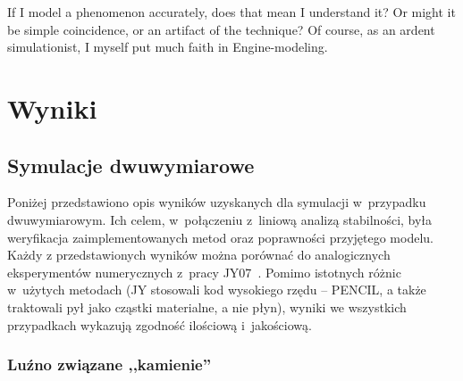 \begin{savequote}[75mm]
   If I model a phenomenon accurately, does that mean I understand it? Or might it be simple coincidence, or an artifact
   of the technique? Of course, as an ardent simulationist, I myself put much faith in Engine-modeling.
\end{savequote}

\chapter{Wyniki}



\section{Symulacje dwuwymiarowe}
\label{sec:sim_2d}
Poniżej przedstawiono opis wyników uzyskanych dla symulacji w~przypadku
dwuwymiarowym. Ich celem, w~połączeniu z~liniową analizą stabilności, była
weryfikacja zaimplementowanych metod oraz poprawności przyjętego modelu. Każdy z
przedstawionych wyników można porównać do analogicznych eksperymentów
numerycznych z~pracy JY07~\cite{JY07}. Pomimo istotnych różnic w~użytych
metodach (JY stosowali kod wysokiego rzędu -- PENCIL, a także traktowali pył
jako cząstki materialne, a nie płyn), wyniki we wszystkich przypadkach wykazują
zgodność ilościową i~jakościową.

\subsection{Luźno związane ,,kamienie''}%

